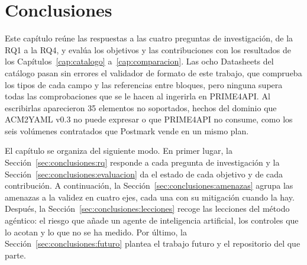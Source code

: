 \chapter{Conclusiones}
\label{cap:conclusiones}

Este capítulo reúne las respuestas a las cuatro preguntas de investigación, de la RQ1 a la RQ4, y evalúa los objetivos y las contribuciones con los resultados de los Capítulos~\ref{cap:catalogo} a~\ref{cap:comparacion}.
Las ocho Datasheets del catálogo pasan sin errores el validador de formato de este trabajo, que comprueba los tipos de cada campo y las referencias entre bloques, pero ninguna supera todas las comprobaciones que se le hacen al ingerirla en PRIME4API.
Al escribirlas aparecieron 35 elementos no soportados, hechos del dominio que ACM2YAML v0.3 no puede expresar o que PRIME4API no consume, como los seis volúmenes contratados que Postmark vende en un mismo plan.

El capítulo se organiza del siguiente modo.
En primer lugar, la Sección~\ref{sec:conclusiones:rq} responde a cada pregunta de investigación y la Sección~\ref{sec:conclusiones:evaluacion} da el estado de cada objetivo y de cada contribución.
A continuación, la Sección~\ref{sec:conclusiones:amenazas} agrupa las amenazas a la validez en cuatro ejes, cada una con su mitigación cuando la hay.
Después, la Sección~\ref{sec:conclusiones:lecciones} recoge las lecciones del método agéntico: el riesgo que añade un agente de inteligencia artificial, los controles que lo acotan y lo que no se ha medido.
Por último, la Sección~\ref{sec:conclusiones:futuro} plantea el trabajo futuro y el repositorio del que parte.






